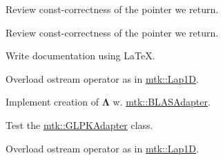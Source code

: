\begin{DoxyRefList}
\item[\label{todo__todo000015}%
\hypertarget{todo__todo000015}{}%
Member \hyperlink{classmtk_1_1UniStgGrid3D_abf4aba911a3f0654e1852cdc9deb7fd7}{mtk\+:\+:Uni\+Stg\+Grid3\+D\+:\+:discrete\+\_\+domain\+\_\+y} () const ]Review const-\/correctness of the pointer we return.  
\item[\label{todo__todo000016}%
\hypertarget{todo__todo000016}{}%
Member \hyperlink{classmtk_1_1UniStgGrid3D_ac98305ff4a6f6d9c8cc49b4c0377547f}{mtk\+:\+:Uni\+Stg\+Grid3\+D\+:\+:discrete\+\_\+domain\+\_\+z} () const ]Review const-\/correctness of the pointer we return.  
\item[\label{todo__todo000017}%
\hypertarget{todo__todo000017}{}%
File \hyperlink{mtk__blas__adapter_8cc}{mtk\+\_\+blas\+\_\+adapter.cc} ]Write documentation using La\+Te\+X. 
\item[\label{todo__todo000022}%
\hypertarget{todo__todo000022}{}%
File \hyperlink{mtk__div__1d_8cc}{mtk\+\_\+div\+\_\+1d.cc} ]Overload ostream operator as in \hyperlink{classmtk_1_1Lap1D}{mtk\+::\+Lap1\+D}.

Implement creation of $ \mathbf{\Lambda}$ w. \hyperlink{classmtk_1_1BLASAdapter}{mtk\+::\+B\+L\+A\+S\+Adapter}.  
\item[\label{todo__todo000033}%
\hypertarget{todo__todo000033}{}%
File \hyperlink{mtk__glpk__adapter__test_8cc}{mtk\+\_\+glpk\+\_\+adapter\+\_\+test.cc} ]Test the \hyperlink{classmtk_1_1GLPKAdapter}{mtk\+::\+G\+L\+P\+K\+Adapter} class.  
\item[\label{todo__todo000024}%
\hypertarget{todo__todo000024}{}%
File \hyperlink{mtk__grad__1d_8cc}{mtk\+\_\+grad\+\_\+1d.cc} ]Overload ostream operator as in \hyperlink{classmtk_1_1Lap1D}{mtk\+::\+Lap1\+D}.


\end{DoxyRefList}
